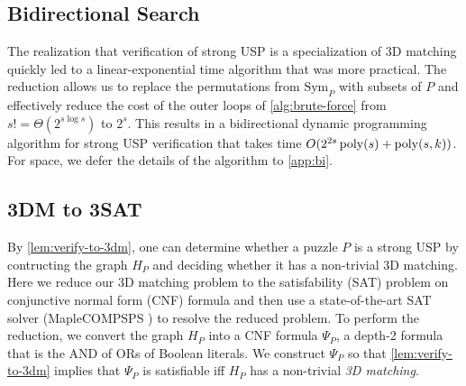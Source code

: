 \documentclass[11pt]{article}
\newcommand\Sym[1]{\ensuremath{\mathrm{Sym}_{#1}}}
\renewcommand\NP{\ensuremath{\mathsf{NP}}}
\begin{document}

\subsection{Bidirectional Search}

The realization that verification of strong USP is a specialization of 3D
matching quickly led to a linear-exponential time algorithm that was
more practical.  The reduction allows us to replace the permutations
from $\Sym{P}$ with subsets of $P$ and effectively reduce the cost of
the outer loops of \autoref{alg:brute-force} from $s! =
\Theta(2^{s\log s})$ to $2^s$.  This results in a bidirectional dynamic programming
algorithm for strong USP verification that takes time $O(2^{2s} \operatorname{poly}(s) +
\operatorname{poly}(s,k))$.  For space, we defer the details of the algorithm to
\autoref{app:bi}.

\subsection{3DM to 3SAT}
\label{subsec:sat}

By \autoref{lem:verify-to-3dm}, one can determine whether a puzzle $P$
is a strong USP by contructing the graph $H_P$ and deciding
whether it has a non-trivial 3D matching.
Here we reduce
our 3D matching problem to the satisfability (SAT) problem on conjunctive normal form (CNF) formula and
then use a state-of-the-art SAT solver (MapleCOMPSPS \cite{lgpc16}) to
resolve the reduced problem. To perform the reduction, we convert the
graph $H_P$
into a CNF formula $\Psi_P$, a depth-2 formula that is the AND
of ORs of Boolean literals.  
We construct $\Psi_P$ so that \autoref{lem:verify-to-3dm} implies that
$\Psi_P$ is satisfiable iff $H_P$ has a non-trivial \emph{3D
  matching}.
\end{document}
